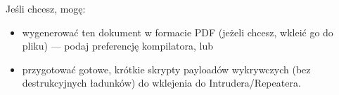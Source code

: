 \documentclass[11pt,a4paper]{article}
\begin{document}
	\bigskip
	\noindent Jeśli chcesz, mogę:
	\begin{itemize}[leftmargin=*]
		\item wygenerować ten dokument w formacie PDF (jeżeli chcesz, wkleić go do pliku) — podaj preferencję kompilatora, lub
		\item przygotować gotowe, krótkie skrypty payloadów wykrywczych (bez destrukcyjnych ładunków) do wklejenia do Intrudera/Repeatera.
	\end{itemize}
	
\end{document}
